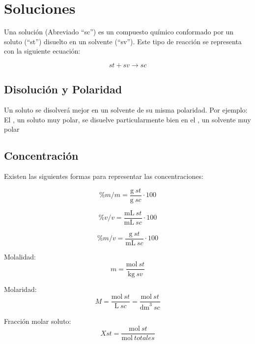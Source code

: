 \documentclass[../teoria.root.tex]{subfiles}
\begin{document}
\section{Soluciones}
Una solución (Abreviado ``sc'') es un compuesto químico conformado por un soluto (``st'') disuelto en un solvente (``sv''). Este tipo de reacción se representa con la siguiente ecuación:

\begin{equation}
	st + sv \rightarrow sc
\end{equation}

\subsection{Disolución y Polaridad}
Un soluto se disolverá mejor en un solvente de su misma polaridad. Por ejemplo: El , un soluto muy polar, se disuelve particularmente bien en el , un solvente muy polar

\subsection{Concentración}
Existen las siguientes formas para representar las concentraciones:

\begin{equation} \label{eq:concentracion.m/m}
	\%m / m = \frac{\si{\g}\ st}{\si{\g}\ sc} \cdot 100
\end{equation}

\begin{equation} \label{eq:concentracion.v/v}
	\%v / v = \frac{\si{\mL}\ st}{\si{\mL}\ sc} \cdot 100
\end{equation}

\begin{equation} \label{eq:concentracion.m/v}
	\%m / v = \frac{\si{\g}\ st}{\si{\mL}\ sc} \cdot 100
\end{equation}

Molalidad:
\begin{equation} \label{eq:concentracion.molalidad}
	m = \frac{\si{\mol}\ st}{\si{\kg}\ sv}
\end{equation}

Molaridad:
\begin{equation} \label{eq:concentracion.molaridad}
	M = \frac{\si{\mol}\ st}{\si{\L}\ sc} = \frac{\si{\mol}\ st}{\si{\dm\cubed}\ sc}
\end{equation}

Fracción molar soluto:
\begin{equation} \label{eq:concentracion.frac soluto}
	Xst = \frac{\si{\mol}\ st}{\si{\mol}\ totales}
\end{equation}
\end{document}
